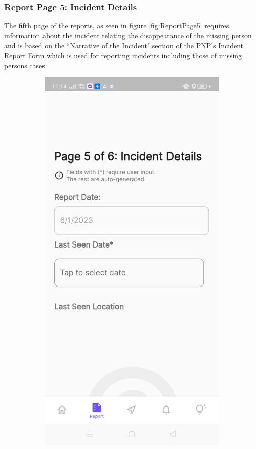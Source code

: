 \subsubsection{Report Page 5: Incident Details}

The fifth page of the reports, as seen in figure \ref{fig:ReportPage5} requires information about the incident relating the disappearance of the missing person and is based on the ``Narrative of the Incident" section of the PNP's Incident Report Form which is used for reporting incidents including those of missing persons cases.

\begin{figure}[!h]
    \centering
    \begin{subfigure}[c]{0.30\linewidth}
        \centering
        \includegraphics[scale=0.15]{figures/Chapter4/Main/p5-1.jpg}

\end{subfigure}
\end{figure}
